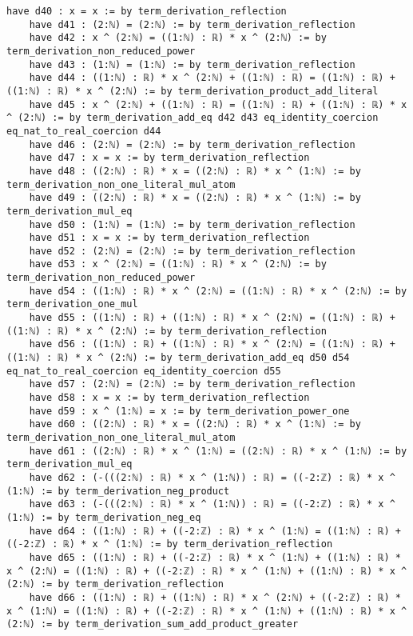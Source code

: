 \documentclass{article}
\begin{document}
\begin{tcolorbox}[colback=white!10, width=\linewidth]
\begin{lstlisting}[language=Lean4]
    have d40 : x = x := by term_derivation_reflection
    have d41 : (2:ℕ) = (2:ℕ) := by term_derivation_reflection
    have d42 : x ^ (2:ℕ) = ((1:ℕ) : ℝ) * x ^ (2:ℕ) := by term_derivation_non_reduced_power
    have d43 : (1:ℕ) = (1:ℕ) := by term_derivation_reflection
    have d44 : ((1:ℕ) : ℝ) * x ^ (2:ℕ) + ((1:ℕ) : ℝ) = ((1:ℕ) : ℝ) + ((1:ℕ) : ℝ) * x ^ (2:ℕ) := by term_derivation_product_add_literal
    have d45 : x ^ (2:ℕ) + ((1:ℕ) : ℝ) = ((1:ℕ) : ℝ) + ((1:ℕ) : ℝ) * x ^ (2:ℕ) := by term_derivation_add_eq d42 d43 eq_identity_coercion eq_nat_to_real_coercion d44
    have d46 : (2:ℕ) = (2:ℕ) := by term_derivation_reflection
    have d47 : x = x := by term_derivation_reflection
    have d48 : ((2:ℕ) : ℝ) * x = ((2:ℕ) : ℝ) * x ^ (1:ℕ) := by term_derivation_non_one_literal_mul_atom
    have d49 : ((2:ℕ) : ℝ) * x = ((2:ℕ) : ℝ) * x ^ (1:ℕ) := by term_derivation_mul_eq
    have d50 : (1:ℕ) = (1:ℕ) := by term_derivation_reflection
    have d51 : x = x := by term_derivation_reflection
    have d52 : (2:ℕ) = (2:ℕ) := by term_derivation_reflection
    have d53 : x ^ (2:ℕ) = ((1:ℕ) : ℝ) * x ^ (2:ℕ) := by term_derivation_non_reduced_power
    have d54 : ((1:ℕ) : ℝ) * x ^ (2:ℕ) = ((1:ℕ) : ℝ) * x ^ (2:ℕ) := by term_derivation_one_mul
    have d55 : ((1:ℕ) : ℝ) + ((1:ℕ) : ℝ) * x ^ (2:ℕ) = ((1:ℕ) : ℝ) + ((1:ℕ) : ℝ) * x ^ (2:ℕ) := by term_derivation_reflection
    have d56 : ((1:ℕ) : ℝ) + ((1:ℕ) : ℝ) * x ^ (2:ℕ) = ((1:ℕ) : ℝ) + ((1:ℕ) : ℝ) * x ^ (2:ℕ) := by term_derivation_add_eq d50 d54 eq_nat_to_real_coercion eq_identity_coercion d55
    have d57 : (2:ℕ) = (2:ℕ) := by term_derivation_reflection
    have d58 : x = x := by term_derivation_reflection
    have d59 : x ^ (1:ℕ) = x := by term_derivation_power_one
    have d60 : ((2:ℕ) : ℝ) * x = ((2:ℕ) : ℝ) * x ^ (1:ℕ) := by term_derivation_non_one_literal_mul_atom
    have d61 : ((2:ℕ) : ℝ) * x ^ (1:ℕ) = ((2:ℕ) : ℝ) * x ^ (1:ℕ) := by term_derivation_mul_eq
    have d62 : (-(((2:ℕ) : ℝ) * x ^ (1:ℕ)) : ℝ) = ((-2:ℤ) : ℝ) * x ^ (1:ℕ) := by term_derivation_neg_product
    have d63 : (-(((2:ℕ) : ℝ) * x ^ (1:ℕ)) : ℝ) = ((-2:ℤ) : ℝ) * x ^ (1:ℕ) := by term_derivation_neg_eq
    have d64 : ((1:ℕ) : ℝ) + ((-2:ℤ) : ℝ) * x ^ (1:ℕ) = ((1:ℕ) : ℝ) + ((-2:ℤ) : ℝ) * x ^ (1:ℕ) := by term_derivation_reflection
    have d65 : ((1:ℕ) : ℝ) + ((-2:ℤ) : ℝ) * x ^ (1:ℕ) + ((1:ℕ) : ℝ) * x ^ (2:ℕ) = ((1:ℕ) : ℝ) + ((-2:ℤ) : ℝ) * x ^ (1:ℕ) + ((1:ℕ) : ℝ) * x ^ (2:ℕ) := by term_derivation_reflection
    have d66 : ((1:ℕ) : ℝ) + ((1:ℕ) : ℝ) * x ^ (2:ℕ) + ((-2:ℤ) : ℝ) * x ^ (1:ℕ) = ((1:ℕ) : ℝ) + ((-2:ℤ) : ℝ) * x ^ (1:ℕ) + ((1:ℕ) : ℝ) * x ^ (2:ℕ) := by term_derivation_sum_add_product_greater

\end{lstlisting}
\end{tcolorbox}
\end{document}
